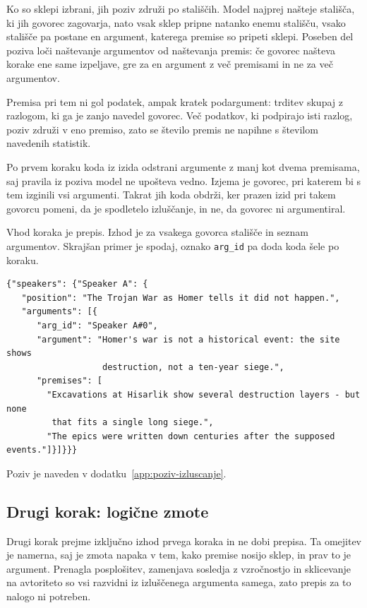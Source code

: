 \documentclass[a4paper, 12pt]{book}
\begin{document}
Ko so sklepi izbrani, jih poziv združi po stališčih. Model najprej našteje
stališča, ki jih govorec zagovarja, nato vsak sklep pripne natanko enemu
stališču, vsako stališče pa postane en argument, katerega premise so pripeti
sklepi. Poseben del poziva loči naštevanje argumentov od naštevanja premis: če
govorec našteva korake ene same izpeljave, gre za en argument z več premisami
in ne za več argumentov.

Premisa pri tem ni gol podatek, ampak kratek podargument: trditev skupaj z
razlogom, ki ga je zanjo navedel govorec. Več podatkov, ki podpirajo isti razlog,
poziv združi v eno premiso, zato se število premis ne napihne s številom
navedenih statistik.

Po prvem koraku koda iz izida odstrani argumente z manj kot dvema premisama, saj
pravila iz poziva model ne upošteva vedno. Izjema je govorec, pri katerem bi s
tem izginili vsi argumenti. Takrat jih koda obdrži, ker prazen izid pri takem
govorcu pomeni, da je spodletelo izluščanje, in ne, da govorec ni argumentiral.

Vhod koraka je prepis. Izhod je za vsakega govorca stališče in seznam
argumentov. Skrajšan primer je spodaj, oznako \texttt{arg\_id} pa doda koda šele
po koraku.

\begin{lstlisting}[basicstyle=\ttfamily\scriptsize,breaklines=true]
{"speakers": {"Speaker A": {
   "position": "The Trojan War as Homer tells it did not happen.",
   "arguments": [{
      "arg_id": "Speaker A#0",
      "argument": "Homer's war is not a historical event: the site shows
                   destruction, not a ten-year siege.",
      "premises": [
        "Excavations at Hisarlik show several destruction layers - but none
         that fits a single long siege.",
        "The epics were written down centuries after the supposed events."]}]}}}
\end{lstlisting}

Poziv je naveden v dodatku~\ref{app:poziv-izluscanje}.

\subsection{Drugi korak: logične zmote}
\label{ssec:prehod2}

Drugi korak prejme izključno izhod prvega koraka in ne dobi prepisa. Ta omejitev
je namerna, saj je zmota napaka v tem, kako premise nosijo sklep, in prav to je
argument. Prenagla posplošitev, zamenjava sosledja z vzročnostjo in sklicevanje
na avtoriteto so vsi razvidni iz izluščenega argumenta samega, zato prepis za to
nalogo ni potreben.
\end{document}

